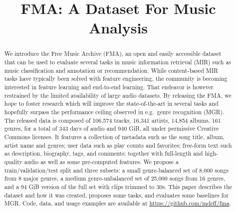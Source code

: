 \documentclass{article}
\title{FMA: A Dataset For Music Analysis}
\newcommand{\ntracks}{106,574 }
\newcommand{\nartists}{16,341 }
\newcommand{\nalbums}{14,854 }
\newcommand{\ngenres}{161 }
\newcommand{\tduration}{343 }
\newcommand{\size}{940 }
\begin{document}
\maketitle

\begin{abstract}
We introduce the Free Music Archive (FMA), an open and easily accessible dataset that can be used to evaluate several tasks in music information retrieval (MIR) such as music classification and annotation or recommendation.
While content-based MIR tasks have typically been solved with feature engineering,
the community is becoming interested in feature learning and end-to-end learning. %
That endeavor is however restrained by the limited availability of large audio datasets.
By releasing the FMA, we hope to foster research which will improve the state-of-the-art in several tasks and hopefully surpass the performance ceiling observed in e.g.\ genre recognition (MGR).
The released data is composed of \ntracks tracks, \nartists artists, \nalbums albums, \ngenres genres, for a total of \tduration days of audio and \size GiB, all under permissive Creative Commons licenses.
It features a collection of metadata such as the song title, album, artist name and genres; user data such as play counts and favorites; free-form text such as description, biography, tags, and comments; together with full-length and high-quality audio as well as some pre-computed features. We propose a train/validation/test split and three subsets: a small genre-balanced set of 8,000 songs from 8 major genres, a medium genre-unbalanced set of 25,000 songs from 16 genres, and a 94 GiB version of the full set with clips trimmed to 30s.
This paper describes the dataset and how it was created, proposes some tasks, and evaluates some baselines for MGR.
Code, data, and usage examples are available at \url{https://github.com/mdeff/fma}.


\end{abstract}
\end{document}
